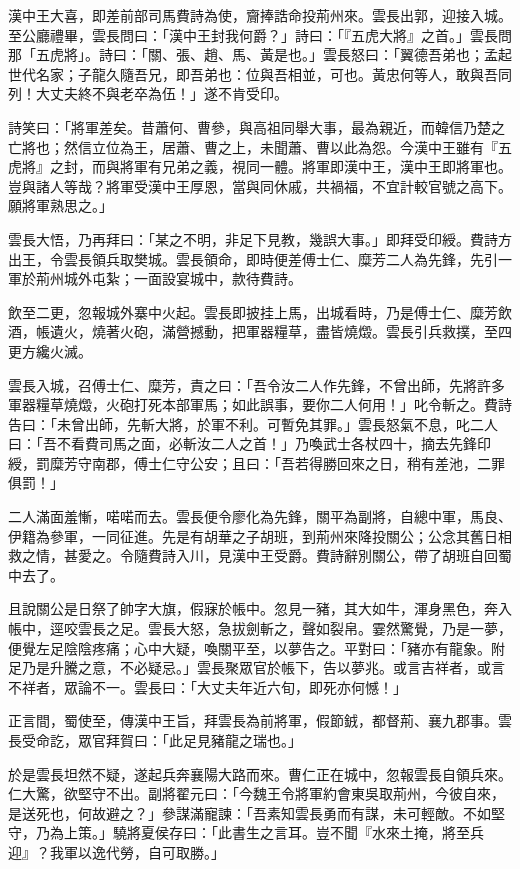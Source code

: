 漢中王大喜，即差前部司馬費詩為使，齎捧誥命投荊州來。雲長出郭，迎接入城。至公廳禮畢，雲長問曰：「漢中王封我何爵？」詩曰：「『五虎大將』之首。」雲長問那「五虎將」。詩曰：「關、張、趙、馬、黃是也。」雲長怒曰：「翼德吾弟也；孟起世代名家；子龍久隨吾兄，即吾弟也：位與吾相並，可也。黃忠何等人，敢與吾同列！大丈夫終不與老卒為伍！」遂不肯受印。

詩笑曰：「將軍差矣。昔蕭何、曹參，與高祖同舉大事，最為親近，而韓信乃楚之亡將也；然信立位為王，居蕭、曹之上，未聞蕭、曹以此為怨。今漢中王雖有『五虎將』之封，而與將軍有兄弟之義，視同一體。將軍即漢中王，漢中王即將軍也。豈與諸人等哉？將軍受漢中王厚恩，當與同休戚，共禍福，不宜計較官號之高下。願將軍熟思之。」

雲長大悟，乃再拜曰：「某之不明，非足下見教，幾誤大事。」即拜受印綬。費詩方出王，令雲長領兵取樊城。雲長領命，即時便差傅士仁、糜芳二人為先鋒，先引一軍於荊州城外屯紮；一面設宴城中，款待費詩。

飲至二更，忽報城外寨中火起。雲長即披挂上馬，出城看時，乃是傅士仁、糜芳飲酒，帳遺火，燒著火砲，滿營撼動，把軍器糧草，盡皆燒燬。雲長引兵救撲，至四更方纔火滅。

雲長入城，召傅士仁、糜芳，責之曰：「吾令汝二人作先鋒，不曾出師，先將許多軍器糧草燒燬，火砲打死本部軍馬；如此誤事，要你二人何用！」叱令斬之。費詩告曰：「未曾出師，先斬大將，於軍不利。可暫免其罪。」雲長怒氣不息，叱二人曰：「吾不看費司馬之面，必斬汝二人之首！」乃喚武士各杖四十，摘去先鋒印綬，罰糜芳守南郡，傅士仁守公安；且曰：「吾若得勝回來之日，稍有差池，二罪俱罰！」

二人滿面羞慚，喏喏而去。雲長便令廖化為先鋒，關平為副將，自總中軍，馬良、伊籍為參軍，一同征進。先是有胡華之子胡班，到荊州來降投關公；公念其舊日相救之情，甚愛之。令隨費詩入川，見漢中王受爵。費詩辭別關公，帶了胡班自回蜀中去了。

且說關公是日祭了帥字大旗，假寐於帳中。忽見一豬，其大如牛，渾身黑色，奔入帳中，逕咬雲長之足。雲長大怒，急拔劍斬之，聲如裂帛。霎然驚覺，乃是一夢，便覺左足陰陰疼痛；心中大疑，喚關平至，以夢告之。平對曰：「豬亦有龍象。附足乃是升騰之意，不必疑忌。」雲長聚眾官於帳下，告以夢兆。或言吉祥者，或言不祥者，眾論不一。雲長曰：「大丈夫年近六旬，即死亦何憾！」

正言間，蜀使至，傳漢中王旨，拜雲長為前將軍，假節銊，都督荊、襄九郡事。雲長受命訖，眾官拜賀曰：「此足見豬龍之瑞也。」

於是雲長坦然不疑，遂起兵奔襄陽大路而來。曹仁正在城中，忽報雲長自領兵來。仁大驚，欲堅守不出。副將翟元曰：「今魏王令將軍約會東吳取荊州，今彼自來，是送死也，何故避之？」參謀滿寵諫：「吾素知雲長勇而有謀，未可輕敵。不如堅守，乃為上策。」驍將夏侯存曰：「此書生之言耳。豈不聞『水來土掩，將至兵迎』？我軍以逸代勞，自可取勝。」


